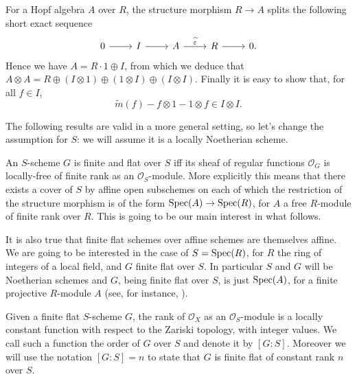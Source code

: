 \begin{defn}
	For a Hopf algebra $A$ over $R$,
	the structure morphism $R \to A$
	splits the following short exact sequence
	\begin{equation*}
	\begin{tikzcd}
		0 \arrow[r, "", rightarrow] &
		I \arrow[r, "", rightarrow] &
		A \arrow[r, "\widetilde{\varepsilon}", rightarrow] &
		R \arrow[r, "", rightarrow] &
		0.
	\end{tikzcd}
	\end{equation*}
	Hence we have $A = R \cdot 1 \oplus I$,
	from which we deduce that $A \otimes A = R \oplus \left( I \otimes 1 \right) \oplus
	\left( 1 \otimes I \right) \oplus \left( I \otimes I \right)$.
	Finally it is easy to show that, for all $f \in I$,
	\begin{equation*}
		\widetilde{m}(f) - f \otimes 1 - 1 \otimes f \in I \otimes I
	.\end{equation*} 
\end{defn}


\noindent
The following results are valid in a more general setting, so let's change
the assumption for $S$: we will assume it is a locally Noetherian scheme.
\begin{rem}\label{rem:finiteGSMotivation}
	An $S$-scheme $G$ is finite and flat over $S$ iff its sheaf of regular functions
	$\mathcal{O}_G$ is locally-free of finite rank as an $\mathcal{O}_S$-module.
	More explicitly this means that there exists a cover of $S$ by affine open subschemes
	on each of which the restriction of the structure morphism is of the form
	$\operatorname{Spec}(A) \to \operatorname{Spec}(R)$, for $A$ a free $R$-module of finite rank over $R$. 
	This is going to be our main interest in what follows.

	It is also true that finite flat schemes over affine schemes
	are themselves affine. 
	We are going to be interested in the case of $S = \operatorname{Spec}(R)$,
	for $R$ the ring of integers of a local field,
	and $G$ finite flat over $S$.
	In particular $S$ and $G$ will be Noetherian schemes
	and $G$, being finite flat over $S$, is just $\operatorname{Spec}(A)$,
	for a finite projective $R$-module $A$ (see, for instance, 
	\cite[\href{https://stacks.math.columbia.edu/tag/00NX}{Lemma 00NX}]{SP}).
\end{rem}


\begin{defn}
	Given a finite flat $S$-scheme $G$, the rank of $\mathcal{O}_X$ as
	an $\mathcal{O}_S$-module is a locally constant function with respect
	to the Zariski topology, with integer values.
	We call such a function the order of $G$ over $S$ and denote it by $[G:S]$.
	Moreover we will use the notation $[G:S] = n$ to state that $G$ is finite flat of
	constant rank $n$ over $S$.
\end{defn}


